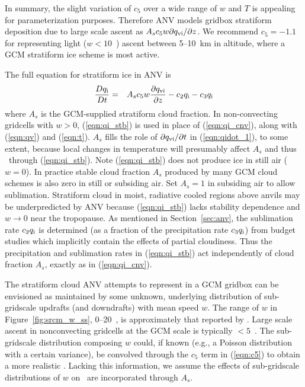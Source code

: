 \documentclass[twoside,agums]{aguplus}
\begin{document}
In summary, the slight variation of $c_5$ over a wide range of $w$ and
$T$ is appealing for parameterization purposes.
Therefore ANV models gridbox stratiform deposition due to large scale
ascent as $A_s c_5 w \mbox{$\partial \mbox{$q_\mathrm{vi}$} / \partial z$}$.
We recommend $c_5 = -1.1$ for representing light ($w < 10$~\cmxs)
ascent between 5--10~km in altitude, where a GCM stratiform ice scheme
is most active. 

The full equation for stratiform ice in ANV is
\begin{eqnarray}
\label{eqn:qi_stb}
{D\qi \over Dt} & 
= & 
A_s c_5 w {\partial \qvi \over \partial z} -
c_2 \qi - 
c_3 \qi
\end{eqnarray}
where $A_s$ is the GCM-supplied stratiform cloud fraction.
In non-convecting gridcells with $w > 0$, (\ref{eqn:qi_stb}) is used
in place of  (\ref{eqn:qi_cnv}), along with (\ref{eqn:qv}) and
(\ref{eqn:t}). 
$A_s$ fills the role of $\partial \mbox{$q_\mathrm{vi}$} / \partial t$ in
(\ref{eqn:qidot_1}), to some extent, because local changes in
temperature will presumably affect $A_s$ and thus \qidot\ through 
(\ref{eqn:qi_stb}).
Note (\ref{eqn:qi_stb}) does not produce ice in still air ($w = 0$).  
In practice stable cloud fraction $A_s$ produced by many GCM
cloud schemes is also zero in still or subsiding air.
Set $A_s = 1$ in subsiding air to allow sublimation.
Stratiform cloud in moist, radiative cooled regions above anvils may
be underpredicted by ANV because (\ref{eqn:qi_stb}) lacks stability
dependence and $w \rightarrow 0$ near the tropopause.
As mentioned in Section~\ref{sec:anv}, the sublimation rate $c_2\mbox{$q_\mathrm{i}$}$
is determined (as a fraction of the precipitation rate $c_3\mbox{$q_\mathrm{i}$}$) from
budget studies which implicitly contain the effects of partial
cloudiness. 
Thus the precipitation and sublimation rates in (\ref{eqn:qi_stb}) act 
independently of cloud fraction $A_s$, exactly as in (\ref{eqn:qi_cnv}).

The stratiform cloud ANV attempts to represent in a GCM gridbox
can be envisioned as maintained by some unknown, underlying
distribution of sub-gridscale updrafts (and downdrafts) with 
mean speed $w$.
The range of $w$ in Figure~\ref{fig:srcm_w_ss}, 0--20~\cmxs, is
approximately that reported by \cite{HeP84}.
Large scale ascent in nonconvecting gridcells at the GCM scale is
typically $< 5$~\cmxs.
The sub-gridscale distribution composing $w$ could, if known (e.g.,
a Poisson distribution with a certain variance), be convolved
through the $c_5$ term in (\ref{eqn:c5}) to obtain a more realistic
\qidot.
Lacking this information, we assume the effects of sub-gridscale
distributions of $w$ on \qidot\ are incorporated through $A_s$.
\end{document}

